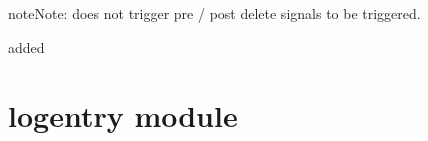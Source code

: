 \documentclass[letterpaper,10pt,english]{sphinxmanual}
\begin{document}
\begin{fulllineitems}
\begin{fulllineitems}
\begin{sphinxadmonition}{note}{Note:}
 does not trigger pre / post delete signals to be
triggered.
\end{sphinxadmonition}

added 

\end{fulllineitems}


\begin{fulllineitems}
\label{\detokenize{item_response:item_response.ItemResponse.objects}}
\end{fulllineitems}


\end{fulllineitems}



\chapter{logentry module}
\label{\detokenize{logentry:module-logentry}}\label{\detokenize{logentry::doc}}\label{\detokenize{logentry:logentry-module}}
\end{document}

